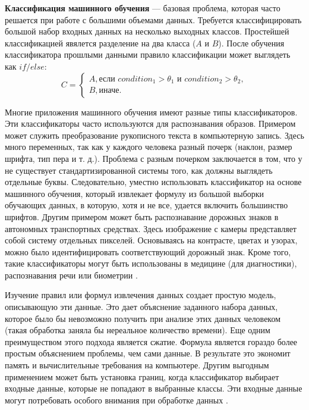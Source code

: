 \textbf{Классификация машинного обучения} --- базовая проблема, которая часто решается при работе с большими объемами данных. Требуется классифицировать большой набор входных данных на несколько выходных классов. Простейшей классификацией явялется разделение на два класса ($A$ и $B$). После обучения классификатора прошлыми данными правило классификации может выглядеть как $if/else$:
\begin{equation}
	C = \begin{cases}
		A, \text{если } condition_{1} > \theta_{1} \text{ и } condition_{2} > \theta_{2}, \\
		B, \text{иначе}.
	\end{cases}
\end{equation}


Многие приложения машинного обучения имеют разные типы классификаторов. Эти классификаторы часто используются для распознавания образов. Примером может служить преобразование рукописного текста в компьютерную запись. Здесь много переменных, так как у каждого человека разный почерк (наклон, размер шрифта, тип пера и т. д.). Проблема с разным почерком заключается в том, что у не существует стандартизированной системы того, как должны выглядеть отдельные буквы. Следовательно, уместно использовать классификатор на основе машинного обучения, который извлекает формулу из большой выборки обучающих данных, в которую, хотя и не все, удается включить большинство шрифтов. Другим примером может быть распознавание дорожных знаков в автономных транспортных средствах. Здесь изображение с камеры представляет собой систему отдельных пикселей. Основываясь на контрасте, цветах и   узорах, можно было идентифицировать соответствующий дорожный знак. Кроме того, такие классификаторы могут быть использованы в медицине (для диагностики), распознавания речи или биометрии \cite{introdmachlearn}.

Изучение правил или формул извлечения данных создает простую модель, описывающую эти данные. Это дает объяснение заданного набора данных, которое было бы невозможно получить при анализе этих данных человеком (такая обработка заняла бы нереальное количество времени). Еще одним преимуществом этого подхода является сжатие. Формула является гораздо более простым объяснением проблемы, чем сами данные. В результате это экономит память и вычислительные требования на компьютере. Другим выгодным применением может быть установка границ, когда классификатор выбирает входные данные, которые не попадают в выбранные классы. Эти входные данные могут потребовать особого внимания при обработке данных \cite{introdmachlearn}.

